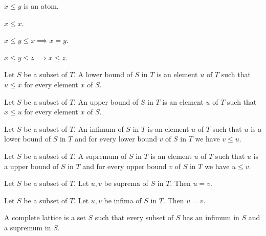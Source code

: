 \documentclass{article}
\begin{document}
  \begin{forthel}

    \begin{signature}[LessRel]
      $x \leq y$ is an atom.
    \end{signature}

    \begin{axiom}[ARefl]
      $x \leq x$.
    \end{axiom}

    \begin{axiom}[ASymm]
      $x \leq y \leq x \implies x = y$.
    \end{axiom}

    \begin{axiom}[ATrans]
      $x \leq y \leq z \implies x \leq z$.
    \end{axiom}

    \begin{definition}[DefLB]
      Let $S$ be a subset of $T$. A lower bound of $S$ in $T$ is an element $u$ of $T$ such that
      $u \leq x$ for every element $x$ of $S$.
    \end{definition}

    \begin{definition}[DefUB]
      Let $S$ be a subset of $T$. An upper bound of $S$ in $T$ is an element $u$ of $T$ such that
      $x \leq u$ for every element $x$ of $S$.
    \end{definition}

    \begin{definition}[DefInf]
      Let $S$ be a subset of $T$. An infimum of $S$ in $T$ is an element $u$ of $T$ such that
      $u$ is a lower bound of $S$ in $T$ and for every lower bound $v$ of $S$ in $T$ we have $v \leq u$.
    \end{definition}

    \begin{definition}[DefSup]
      Let $S$ be a subset of $T$. A supremum of $S$ in $T$ is an element $u$ of $T$ such that
      $u$ is a upper bound of $S$ in $T$ and for every upper bound $v$ of $S$ in $T$ we have $u \leq v$.
    \end{definition}

    \begin{lemma}[SupUn]
      Let $S$ be a subset of $T$. Let $u,v$ be suprema of $S$ in $T$. Then $u = v$.
    \end{lemma}

    \begin{lemma}[InfUn]
      Let $S$ be a subset of $T$. Let $u,v$ be infima of $S$ in $T$. Then $u = v$.
    \end{lemma}

    \begin{definition}[DefCLat]
      A complete lattice is a set $S$ such that every subset of $S$ has an infimum in $S$ and a supremum in $S$.
    \end{definition}
  \end{forthel}
\end{document}
